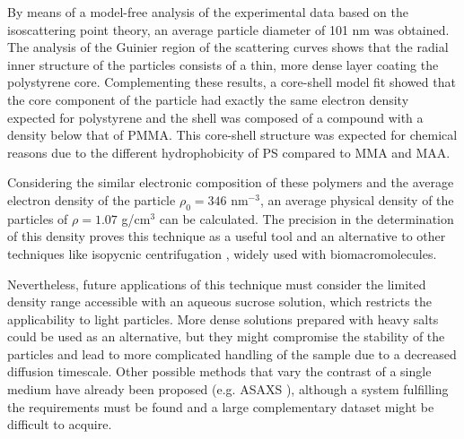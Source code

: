 By means of a model-free analysis of the experimental data based on the isoscattering point theory, an average particle diameter of 101 nm was obtained. The analysis of the Guinier region of the scattering curves shows that the radial inner structure of the particles consists of a thin, more dense layer coating the polystyrene core. Complementing these results, a core-shell model fit showed that the core component of the particle had exactly the same electron density expected for polystyrene and the shell was composed of a compound with a density below that of PMMA. This core-shell structure was expected for chemical reasons due to the different hydrophobicity of PS compared to MMA and MAA.

Considering the similar electronic composition of these polymers and the average electron density of the particle $\rho_0=346$ nm\(^{-3}\), an average physical density of the particles of $\rho=1.07$ g/cm\(^{3}\) can be calculated. The precision in the determination of this density proves this technique as a useful tool and an alternative to other techniques like isopycnic centrifugation \cite{Vauthier1999,Arnold2006,Sun2009}, widely used with biomacromolecules.

Nevertheless, future applications of this technique must consider the limited density range accessible with an aqueous sucrose solution, which restricts the applicability to light particles. More dense solutions prepared with heavy salts could be used as an alternative, but they might compromise the stability of the particles and lead to more complicated handling of the sample due to a decreased diffusion timescale. Other possible methods that vary the contrast of a single medium have already been proposed (e.g. ASAXS \cite{Stuhrmann2007}), although a system fulfilling the requirements must be found and a large complementary dataset might be difficult to acquire.


\label{sec:results}

